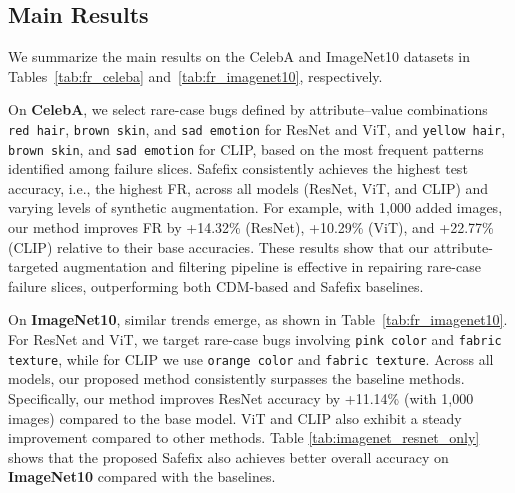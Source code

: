 \documentclass[10pt]{article} %
\newcommand{\model}{Safefix\xspace}
\newcommand{\hibug}{Safefix\xspace}
\begin{document}
\subsection{Main Results} 
\label{sec:main_results}




We summarize the main results on the CelebA and ImageNet10 datasets in Tables~\ref{tab:fr_celeba} and~\ref{tab:fr_imagenet10}, respectively.



On \textbf{CelebA}, we select rare-case bugs defined by attribute–value combinations \texttt{red hair}, \texttt{brown skin}, and \texttt{sad emotion} for ResNet and ViT, and \texttt{yellow hair}, \texttt{brown skin}, and \texttt{sad emotion} for CLIP, based on the most frequent patterns identified among failure slices. \model{} consistently achieves the highest test accuracy, i.e., the highest FR, across all models (ResNet, ViT, and CLIP) and varying levels of synthetic augmentation. For example, with 1{,}000 added images, our method improves FR by +14.32\% (ResNet), +10.29\% (ViT), and +22.77\% (CLIP) relative to their base accuracies. These results show that our attribute-targeted augmentation and filtering pipeline is effective in repairing rare-case failure slices, outperforming both CDM-based and \hibug{} baselines.


On \textbf{ImageNet10}, similar trends emerge, as shown in Table~\ref{tab:fr_imagenet10}. For ResNet and ViT, we target rare-case bugs involving \texttt{pink color} and \texttt{fabric texture}, while for CLIP we use \texttt{orange color} and \texttt{fabric texture}. Across all models, our proposed method consistently surpasses the baseline methods. Specifically, our method improves ResNet accuracy by +11.14\% (with 1{,}000 images) compared to the base model. ViT and CLIP also exhibit a steady improvement compared to other methods. Table \ref{tab:imagenet_resnet_only} shows that the proposed Safefix also achieves better overall accuracy on \textbf{ImageNet10} compared with the baselines.



\end{document}
